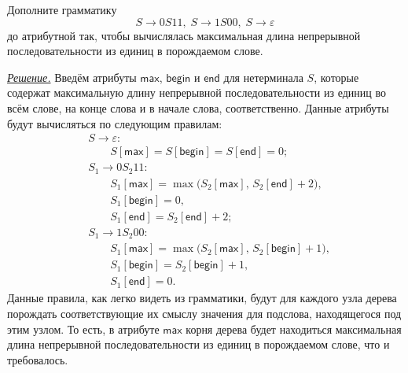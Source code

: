\documentclass[10pt]{article}
\newcounter{pr} \setcounter{pr}{0}
\newenvironment{sol}
  {\par
   {\itshape \underline{Решение.}}}
  {}
\newcommand{\eps}{\varepsilon}
\newcommand{\amax}{\mathsf{max}}
\newcommand{\abegin}{\mathsf{begin}}
\newcommand{\aend}{\mathsf{end}}
\begin{document}
  \begin{pr}
    Дополните грамматику
    \[
      S \to 0S11,\; S \to 1S00,\; S \to \eps
    \]
    до атрибутной так, чтобы вычислялась максимальная длина непрерывной последовательности из единиц в порождаемом слове.
    \begin{sol}
      Введём атрибуты $\amax$, $\abegin$ и $\aend$ для нетерминала $S$, которые содержат максимальную длину непрерывной последовательности из единиц во всём слове, на конце слова и в начале слова, соответственно. Данные атрибуты будут вычисляться по следующим правилам:
      \begin{align*}
        & S \to \eps: \\
        & \qquad S[\amax] = S[\abegin] = S[\aend] = 0; \\
        & S_1 \to 0 S_2 11: \\
        & \qquad S_1[\amax] = \max\big( S_2[\amax],\, S_2[\aend] + 2 \big), \\
        & \qquad S_1[\abegin] = 0, \\
        & \qquad S_1[\aend] = S_2[\aend] + 2; \\
        & S_1 \to 1 S_2 00: \\
        & \qquad S_1[\amax] = \max\big( S_2[\amax],\, S_2[\abegin] + 1 \big), \\
        & \qquad S_1[\abegin] = S_2[\abegin] + 1, \\
        & \qquad S_1[\aend] = 0.
      \end{align*}
      Данные правила, как легко видеть из грамматики, будут для каждого узла дерева порождать соответствующие их смыслу значения для подслова, находящегося под этим узлом. То есть, в атрибуте $\amax$ корня дерева будет находиться максимальная длина непрерывной последовательности из единиц в порождаемом слове, что и требовалось.
    \end{sol}
  \end{pr}
\end{document}
